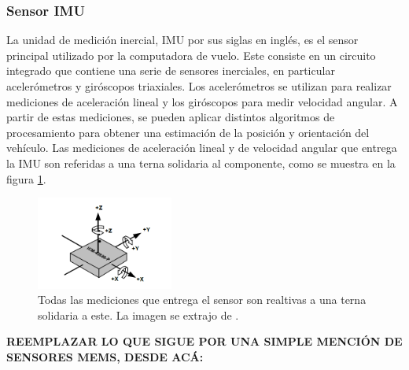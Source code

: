 




\subsubsection{Sensor IMU}

La unidad de medición inercial, IMU por sus siglas en inglés, es el sensor principal utilizado por la computadora de vuelo. Este consiste en un circuito integrado que contiene una serie de sensores inerciales, en particular acelerómetros y giróscopos triaxiales. Los acelerómetros se utilizan para realizar mediciones de aceleración lineal y los giróscopos para medir velocidad angular. A partir de estas mediciones, se pueden aplicar distintos algoritmos de procesamiento para obtener una estimación de la posición y orientación del vehículo. Las mediciones de aceleración lineal y de velocidad angular que entrega la IMU son referidas a una terna solidaria al componente, como se muestra en la figura \ref{fig:IMU_ejes}.

\begin{figure}[H]
    \centering
    \includegraphics[width=0.4\textwidth]{img/IMU_ejes.png}
    \caption{Todas las mediciones que entrega el sensor son realtivas a una terna solidaria a este. La imagen se extrajo de \cite{ICM42688pDatasheet}.}
    \label{fig:IMU_ejes}
\end{figure}

\textbf{{\color{red} REEMPLAZAR LO QUE SIGUE POR UNA SIMPLE MENCIÓN DE SENSORES MEMS, DESDE ACÁ:}}

